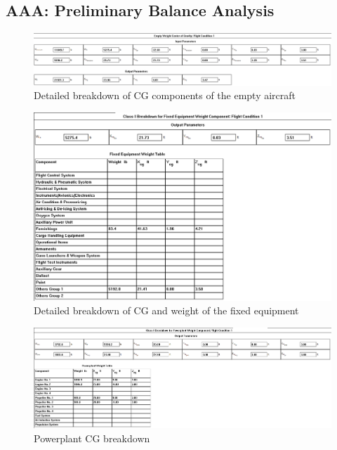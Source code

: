 \documentclass[conf]{new-aiaa}
\begin{document}
\subsection{AAA: Preliminary Balance Analysis}

\begin{figure}[H]
    \includegraphics[width=\textwidth]{Report3Printouts/Cg/Cg_Empty_Detailed_Empty_cropped.png}
    \caption{Detailed breakdown of CG components of the empty aircraft}
    \label{fig:cg_detailed_empty}
\end{figure}

\begin{figure}[H]
    \includegraphics[width=\textwidth]{Report3Printouts/Cg/Cg_Empty_Detailed_FixedEquipment_cropped.png}
    \caption{Detailed breakdown of CG and weight of the fixed equipment}
    \label{fig:cg_empty_detailed_fixedequipment}
\end{figure}

\begin{figure}[H]
    \includegraphics[width=\textwidth]{Report3Printouts/Cg/Cg_Empty_Detailed_Powerplant_cropped.png}
    \caption{Powerplant CG breakdown}
    \label{fig:cg_empty_detailed_powerplant}
\end{figure}
\end{document}
